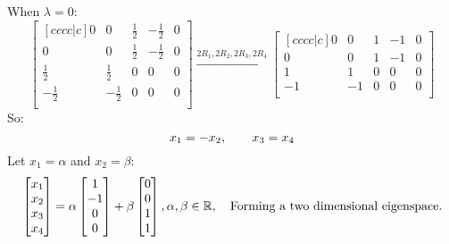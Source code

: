 \documentclass[12pt]{article}
\begin{document}
When $\lambda=0$:\\
$$
\begin{bmatrix}[cccc|c]
	0 & 0 & \frac{1}{2} & -\frac{1}{2} & 0 \\
	0 & 0 & \frac{1}{2} & -\frac{1}{2} & 0 \\
	\frac{1}{2} & \frac{1}{2} & 0 & 0 & 0 \\
	-\frac{1}{2} & -\frac{1}{2} & 0 & 0 & 0 \\
\end{bmatrix}
\overset{2R_1, 2R_2, 2R_3, 2R_4}{\longrightarrow} 
\begin{bmatrix}[cccc|c]
	0 & 0 & 1 & -1 & 0 \\
	0 & 0 & 1 & -1 & 0 \\
	1 & 1 & 0 & 0 & 0 \\
	-1 & -1 & 0 & 0 & 0 \\
\end{bmatrix}
$$
So:
$$
x_1=-x_2, \hspace{20px} x_3=x_4
$$
Let $x_1=\alpha$ and $x_2=\beta$:
$$
\begin{bmatrix}
	x_1 \\
	x_2 \\
	x_3 \\
	x_4 \\
\end{bmatrix}
=
\alpha
\begin{bmatrix}
	1 \\
	-1 \\
	0 \\
	0 \\
\end{bmatrix}
+\beta
\begin{bmatrix}
	0 \\
	0 \\
	1 \\
	1 \\
\end{bmatrix},
\alpha, \beta \in \mathbb{R}
,
\hspace{10px}
\text{Forming a two dimensional eigenspace.}
$$
\end{document}
